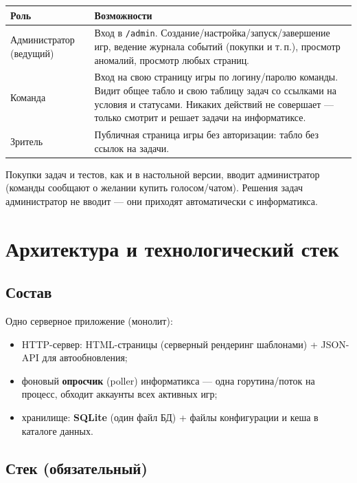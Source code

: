 \documentclass[12pt,a4paper]{article}
\newcommand{\field}[1]{\texttt{#1}}
\begin{document}
\begin{longtable}{@{}p{3.2cm}p{12.3cm}@{}}
\toprule
\textbf{Роль} & \textbf{Возможности} \\
\midrule
Администратор (ведущий) & Вход в \field{/admin}. Создание/настройка/запуск/завершение игр, ведение журнала событий (покупки и т.\,п.), просмотр аномалий, просмотр любых страниц. \\
Команда & Вход на свою страницу игры по логину/паролю команды. Видит общее табло и свою таблицу задач со ссылками на условия и статусами. Никаких действий не совершает --- только смотрит и решает задачи на информатиксе. \\
Зритель & Публичная страница игры без авторизации: табло без ссылок на задачи. \\
\bottomrule
\end{longtable}

Покупки задач и тестов, как и в настольной версии, вводит администратор
(команды сообщают о желании купить голосом/чатом). Решения задач
администратор не вводит --- они приходят автоматически с информатикса.

\section{Архитектура и технологический стек}
\label{sec:arch}

\subsection{Состав}

Одно серверное приложение (монолит):

\begin{itemize}[nosep]
  \item HTTP-сервер: HTML-страницы (серверный рендеринг шаблонами) +
        JSON-API для автообновления;
  \item фоновый \textbf{опросчик} (poller) информатикса --- одна горутина/поток
        на процесс, обходит аккаунты всех активных игр;
  \item хранилище: \textbf{SQLite} (один файл БД) + файлы конфигурации и
        кеша в каталоге данных.
\end{itemize}

\subsection{Стек (обязательный)}
\end{document}
